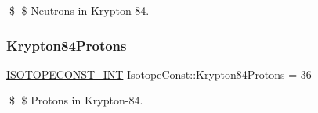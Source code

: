 \$ \$ Neutrons in Krypton-\/84. \mbox{\label{group___isotope_const-_krypton-_kr84_ga4f7f0e2c71c660687fe58b100023cfb8}} 
\subsubsection{\texorpdfstring{Krypton84\+Protons}{Krypton84Protons}}
{\footnotesize\ttfamily \mbox{\hyperlink{group___isotope_const-_macros_ga5f18360b3e99483a35c32d789e62621c}{I\+S\+O\+T\+O\+P\+E\+C\+O\+N\+S\+T\+\_\+\+I\+NT}} Isotope\+Const\+::\+Krypton84\+Protons = 36}

\$ \$ Protons in Krypton-\/84. 